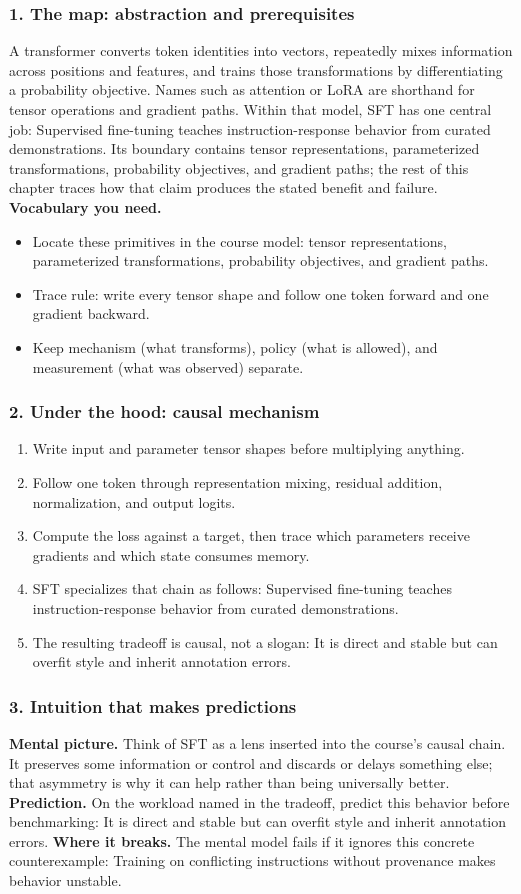 \subsubsection*{1. The map: abstraction and prerequisites}
A transformer converts token identities into vectors, repeatedly mixes information across positions and features, and trains those transformations by differentiating a probability objective. Names such as attention or LoRA are shorthand for tensor operations and gradient paths.
Within that model, SFT has one central job: Supervised fine-tuning teaches instruction-response behavior from curated demonstrations. Its boundary contains tensor representations, parameterized transformations, probability objectives, and gradient paths; the rest of this chapter traces how that claim produces the stated benefit and failure.
\textbf{Vocabulary you need.}\begin{itemize}
\item Locate these primitives in the course model: tensor representations, parameterized transformations, probability objectives, and gradient paths.
\item Trace rule: write every tensor shape and follow one token forward and one gradient backward.
\item Keep mechanism (what transforms), policy (what is allowed), and measurement (what was observed) separate.
\end{itemize}
\subsubsection*{2. Under the hood: causal mechanism}\begin{enumerate}
\item Write input and parameter tensor shapes before multiplying anything.
\item Follow one token through representation mixing, residual addition, normalization, and output logits.
\item Compute the loss against a target, then trace which parameters receive gradients and which state consumes memory.
\item SFT specializes that chain as follows: Supervised fine-tuning teaches instruction-response behavior from curated demonstrations.
\item The resulting tradeoff is causal, not a slogan: It is direct and stable but can overfit style and inherit annotation errors.
\end{enumerate}
\subsubsection*{3. Intuition that makes predictions}
\textbf{Mental picture.} Think of SFT as a lens inserted into the course's causal chain. It preserves some information or control and discards or delays something else; that asymmetry is why it can help rather than being universally better.
\textbf{Prediction.} On the workload named in the tradeoff, predict this behavior before benchmarking: It is direct and stable but can overfit style and inherit annotation errors.
\textbf{Where it breaks.} The mental model fails if it ignores this concrete counterexample: Training on conflicting instructions without provenance makes behavior unstable.
